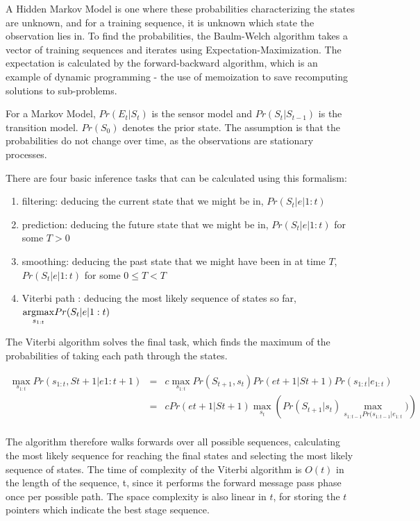 \documentclass[12pt,a4,notitlepage]{report}
\renewcommand{\_}{\texttt{\symbol{95}}}
\newcommand{\<}{\texttt{\symbol{60}}}
\renewcommand{\>}{\texttt{\symbol{62}}}
\begin{document}
A Hidden Markov Model is one where these probabilities characterizing the states are unknown, and for a training sequence, it is unknown which state the observation lies in. To find the probabilities, the Baulm-Welch algorithm takes a vector of training sequences and iterates using Expectation-Maximization. The expectation is calculated by the forward-backward algorithm, which is an example of dynamic programming - the use of memoization to save recomputing solutions to sub-problems.

For a Markov Model, $Pr(E_t|S_t)$ is the sensor model and $Pr(S_t|S_{t-1})$ is the transition model. $Pr(S_0)$ denotes the prior state.\cite{AIModern} The assumption is that the probabilities do not change over time, as the observations are stationary processes.

There are four basic inference tasks that can be calculated using this formalism:

\begin{enumerate}
\item filtering: deducing the current state that we might be in, $Pr(S_t|e|{1:t})$
\item prediction: deducing the future state that we might be in, $Pr(S_t|e|{1:t})$ for some $T>0$
\item smoothing: deducing the past state that we might have been in at time $T$, $Pr(S_t|e|{1:t})$ for some $0 \le T < T$
\item Viterbi path : deducing the most likely sequence of states so far, $\underset{s_{1:t}}{\operatornamewithlimits{argmax}}Pr(S_t|e|{1:t})$
\end{enumerate}

The Viterbi algorithm solves the final task, which finds the maximum of the probabilities of taking each path through the states.

\begin{eqnarray*}
\max_{s_{1:t}} Pr(s_{1:t},S{t+1}|e{1:t+1}) &=& c \max_{s_{1:t}} Pr(S_{t+1},s_t) Pr(e{t+1}|S{t+1}) Pr(s_{1:t}|e_{1:t}) \\
 &=& c Pr (e{t+1}|S{t+1}) \max_{s_t}\left( Pr(S_{t+1}|s_t) \max_{s_{1:t-1} Pr(s_{1:t-1}|e_{1:t}}) \right) \\
\end{eqnarray*}

The algorithm therefore walks forwards over all possible sequences, calculating the most likely sequence for reaching the final states and selecting the most likely sequence of states. The time of complexity of the Viterbi algorithm is $O(t)$ in the length of the sequence, t, since it performs the forward message pass phase once per possible path. The space complexity is also linear in $t$, for storing the $t$ pointers which indicate the best stage sequence.
\end{document}
